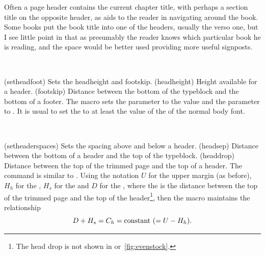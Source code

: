     Often a page header contains the current chapter title, with perhaps a 
section title on the opposite header, as aids to the reader in navigating 
around the book. Some books put the book title into one of the headers, 
usually the verso one, but I see 
little point in that as presumably the reader knows which particular book he
is reading, and the space would be better used providing more useful signposts.


\begin{syntax}
\cmd{\setheadfoot} \\
\end{syntax}
\glossary(setheadfoot)%
  {}%
  {Sets the headheight and footskip.}
\glossary(headheight)%
  {}%
  {Height available for a header.}
\glossary(footskip)%
  {}%
  {Distance between the bottom of the typeblock and the bottom of a footer.}
The \cmd{\setheadfoot} macro sets the
\lnc{\headheight} parameter to the value  and the
\lnc{\footskip} parameter to . It is usual to set the
\lnc{\headheight} to at least the value of the \lnc{\baselineskip} of
the normal body font.


\begin{syntax}
\cmd{\setheaderspaces} \\
\end{syntax}
\glossary(setheaderspaces)%
  {}%
  {Sets the spacing above and below a header.}
\glossary(headsep)%
  {}%
  {Distance between the bottom of a header and the top of the typeblock.}
\glossary(headdrop)%
  {}%
  {Distance between the top of the trimmed page and the top of a header.}
The command \cmd{\setheaderspaces} is similar to \cmd{\setulmargins}.
Using the notation $U$ for the upper margin (as before), $H_{h}$ for the
\lnc{\headheight}, $H_{s}$ for the \lnc{\headsep} and $D$ for the
\lnc{\headdrop}, where the \lnc{\headdrop} is the distance between the top
of the trimmed page and the top of the header\footnote{The head drop is not
shown in  or~\ref{fig:evenstock}.}, 
then the macro \cmd{\setheaderspaces} maintains the relationship
\begin{displaymath}
D + H_{s} = C_{h}  = \textrm{constant} \mbox{\space} (= U - H_{h}).
\end{displaymath}

